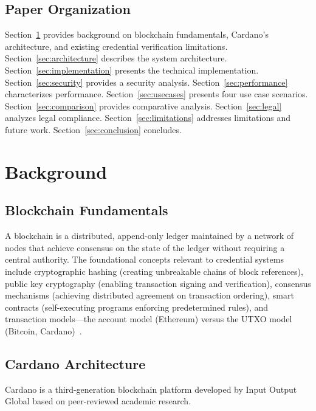 \documentclass[conference,10pt]{IEEEtran}
\begin{document}
\subsection{Paper Organization}

Section~\ref{sec:background} provides background on blockchain fundamentals, Cardano's architecture, and existing credential verification limitations. Section~\ref{sec:architecture} describes the system architecture. Section~\ref{sec:implementation} presents the technical implementation. Section~\ref{sec:security} provides a security analysis. Section~\ref{sec:performance} characterizes performance. Section~\ref{sec:usecases} presents four use case scenarios. Section~\ref{sec:comparison} provides comparative analysis. Section~\ref{sec:legal} analyzes legal compliance. Section~\ref{sec:limitations} addresses limitations and future work. Section~\ref{sec:conclusion} concludes.

\section{Background}
\label{sec:background}

\subsection{Blockchain Fundamentals}

A blockchain is a distributed, append-only ledger maintained by a network of nodes that achieve consensus on the state of the ledger without requiring a central authority. The foundational concepts relevant to credential systems include cryptographic hashing (creating unbreakable chains of block references), public key cryptography (enabling transaction signing and verification), consensus mechanisms (achieving distributed agreement on transaction ordering), smart contracts (self-executing programs enforcing predetermined rules), and transaction models---the account model (Ethereum) versus the UTXO model (Bitcoin, Cardano)~\cite{nakamoto2008}.

\subsection{Cardano Architecture}

Cardano is a third-generation blockchain platform developed by Input Output Global based on peer-reviewed academic research.
\end{document}
